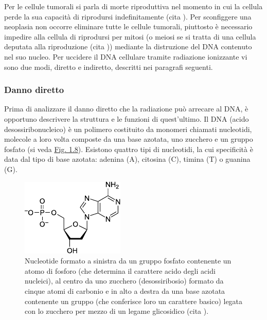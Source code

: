 \documentclass[12pt,a4paper,twoside]{report}
\begin{document}
	Per le cellule tumorali si parla di morte riproduttiva nel momento in cui la cellula perde la sua capacità di riprodursi indefinitamente (cita
	). Per sconfiggere una neoplasia non occorre eliminare tutte le cellule tumorali, piuttosto è necessario impedire alla cellula di riprodursi per mitosi (o meiosi se si tratta di una cellula deputata alla riproduzione (cita
	)) mediante la distruzione del DNA contenuto nel suo nucleo. Per uccidere il DNA cellulare tramite radiazione ionizzante vi sono due modi, diretto e indiretto, descritti nei paragrafi seguenti.
	
	\subsubsection{Danno diretto}\label{par:danno_diretto}
	Prima di analizzare il danno diretto che la radiazione può arrecare al DNA, è opportuno descrivere la struttura e le funzioni di quest'ultimo. Il DNA (acido desossiribonucleico) è un polimero costituito da monomeri chiamati nucleotidi, molecole a loro volta composte da una base azotata, uno zucchero e un gruppo fosfato (si veda \hyperref[fig:nucleotide]{Fig. 1.8}). Esistono quattro tipi di nucleotidi, la cui specificità è data dal tipo di base azotata: adenina (A), citosina (C), timina (T) o guanina (G).
	\begin{figure}[H]
		\centering
		\includegraphics[width=0.9\linewidth]{nucleotide.pdf}
		\caption{Nucleotide formato a sinistra da un gruppo fosfato contenente un atomo di fosforo  (che determina il carattere acido degli acidi nucleici), al centro da uno zucchero (desossiribosio) formato da cinque atomi di carbonio e in alto a destra da una base azotata contenente un gruppo  (che conferisce loro un carattere basico) legata con lo zucchero per mezzo di un legame glicosidico (cita
			).}
		\label{fig:nucleotide}
	\end{figure}
\end{document}
